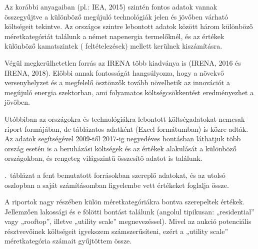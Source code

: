 \documentclass[twoside, magyar, showtrims]{corvinusphd}
\theoremstyle{plain}
\theoremstyle{remark}
\theoremstyle{definition}
\begin{document}
Az  korábbi anyagaiban (pl.: IEA, 2015)
szintén fontos adatok vannak összegyűjtve a különböző
megújuló technológiák jelen és jövőben várható költségeit tekintve.
Az országos szintre lebontott adatok között
három különböző méretkategóriát találunk a német napenergia termelőknél,
és az  értékek különböző kamatszintek 
( feltételezések) mellett kerülnek kiszámításra. 

Végül megkerülhetetlen forrás az IRENA több kiadványa is
(IRENA, 2016 és IRENA, 2018).
Előbbi annak fontosságát hangsúlyozza, hogy
a növekvő versenyhelyzet és a megfelelő ösztönzők
tovább növelhetik az innovációt a megújuló energia szektorban,
ami folyamatos költségcsökkentést eredményezhet a jövőben.

Utóbbiban az országokra és technológiákra lebontott
költségadatokat nemcsak riport formájában,
de táblázatos adatként (Excel formátumban) is közre adták.
Az adatok segítségével 2009-től 2017-ig
negyedéves bontásban láthatjuk több ország esetén is
a beruházási költségek és az 
értékek alakulását a különböző országokban,
és rengeteg világszintű összesítő adatot is találunk.

.~táblázat a fent bemutatott
forrásokban szereplő adatokat,  és az utolsó oszlopban a
saját számításomban figyelembe vett értékeket foglalja össze.

A riportok nagy részében külön méretkategóriákra bontva szerepeltek értékek. 
Jellemzően lakossági és e fölötti bontást találunk
(angolul tipikusan: „residential” vagy „rooftop”,
illetve „utility scale” megnevezéssel). 
Mivel az aukció potenciális résztvevőinek
költségeit igyekszem számszerűsíteni, ezért a „utility scale”
méretkategória számait gyűjtöttem össze.

\label{invcost}
\end{document}
